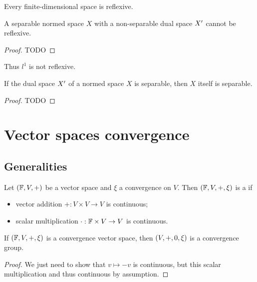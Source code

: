 \begin{lemma}
Every finite-dimensional space is reflexive.
\end{lemma}

\begin{proposition}
A separable normed space $X$ with a non-separable dual space ${X}^\prime$ cannot be reflexive. 
\end{proposition}
\begin{proof}
TODO
\end{proof}
Thus $l^1$ is not reflexive.

\begin{proposition}
If the dual space ${X}^\prime$ of a  normed space $X$ is separable, then $X$ itself is separable. 
\end{proposition}
\begin{proof}
TODO
\end{proof}


\chapter{Vector spaces convergence}

\section{Generalities}
\begin{definition}
Let $\left( \mathbb{F},V,+ \right)$ be a vector space and $\xi$ a convergence on $V$. Then $\left( \mathbb{F},V,+, \xi \right)$ is a  if
\begin{itemize}
\item vector addition $+: V\times V \to V$ is continuous;
\item scalar multiplication $\cdot: \mathbb{F}\times V \to V$ is continuous.
\end{itemize}
\end{definition}

\begin{lemma}
If $\left( \mathbb{F},V,+, \xi \right)$ is a convergence vector space, then $\left( V,+, 0, \xi \right)$ is a convergence group.
\end{lemma}
\begin{proof}
We just need to show that $v\mapsto -v$ is continuous, but this scalar multiplication and thus continuous by assumption.
\end{proof}

